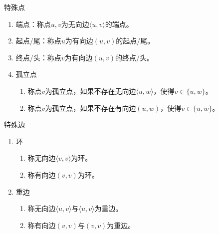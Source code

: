 \documentclass[lang = cn, scheme = chinese, thmcnt = section]{elegantbook}
\begin{document}
\begin{definition}{特殊点}
	\begin{enumerate}
		\item 端点：称点$u,v$为无向边$\langle u,v \rangle$的端点。
		\item 起点/尾：称点$u$为有向边$(u,v)$的起点/尾。
		\item 终点/头：称点$v$为有向边$(u,v)$的终点/头。
		\item 孤立点
		\begin{enumerate}
			\item 称点$v$为孤立点，如果不存在无向边$\langle u,w \rangle$，使得$v\in\{ u,w \}$。
			\item 称点$v$为孤立点，如果不存在有向边$(u,w)$，使得$v\in\{ u,w \}$。
		\end{enumerate}
	\end{enumerate}
\end{definition}

\begin{definition}{特殊边}
	\begin{enumerate}
		\item 环
		\begin{enumerate}
			\item 称无向边$\langle v,v \rangle$为环。
			\item 称有向边$(v,v)$为环。
		\end{enumerate}
		\item 重边
		\begin{enumerate}
			\item 称无向边$\langle u,v \rangle$与$\langle u,v \rangle$为重边。
			\item 称有向边$(v,v)$与$(v,v)$为重边。
		\end{enumerate}
	\end{enumerate}
\end{definition}
\end{document}
